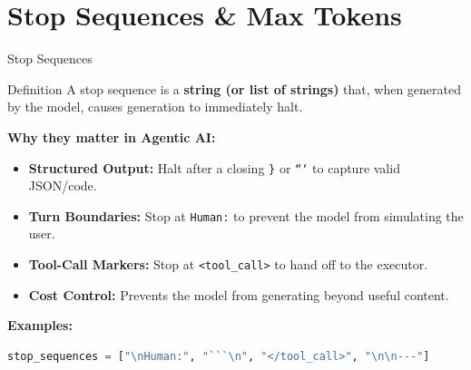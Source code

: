 \documentclass{beamer}
\begin{document}
\section{Stop Sequences \& Max Tokens}

\begin{frame}{Stop Sequences}
    \begin{block}{Definition}
        A stop sequence is a \textbf{string (or list of strings)} that, when generated by the model,
        causes generation to immediately halt.
    \end{block}

    \vspace{0.2cm}
    \textbf{Why they matter in Agentic AI:}
    \begin{itemize}
        \item \textbf{Structured Output:} Halt after a closing \texttt{\}} or \texttt{```} to capture valid JSON/code.
        \item \textbf{Turn Boundaries:} Stop at \texttt{Human:} to prevent the model from simulating the user.
        \item \textbf{Tool-Call Markers:} Stop at \texttt{<tool\_call>} to hand off to the executor.
        \item \textbf{Cost Control:} Prevents the model from generating beyond useful content.
    \end{itemize}

    \vspace{0.2cm}
    \textbf{Examples:}
    \begin{lstlisting}[language=Python]
stop_sequences = ["\nHuman:", "```\n", "</tool_call>", "\n\n---"]
    \end{lstlisting}
\end{frame}
\end{document}

